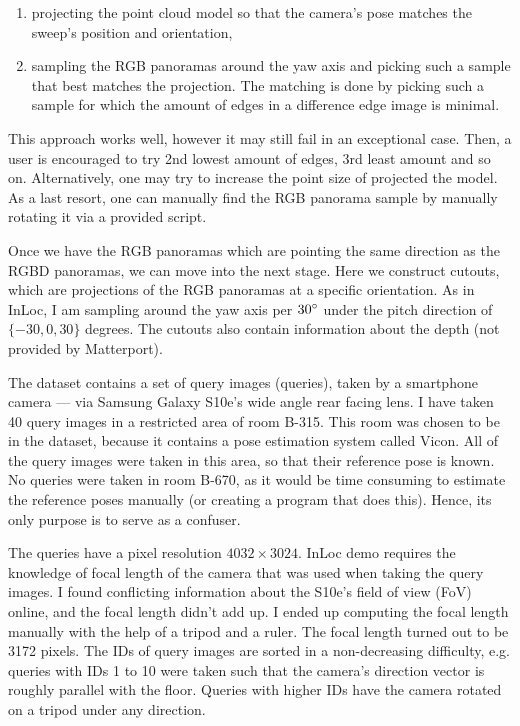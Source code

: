 \documentclass[twoside]{ctuthesis}
\theoremstyle{plain}
\theoremstyle{definition}
\theoremstyle{note}
\begin{document}
\begin{enumerate}
	\item projecting the point cloud model so that the camera's pose matches the sweep's position and orientation,
	\item sampling the RGB panoramas around the yaw axis and picking such a sample that best matches the projection. The matching is done by picking such a sample for which the amount of edges in a difference edge image is minimal.
\end{enumerate}

This approach works well, however it may still fail in an exceptional case. Then, a user is encouraged to try 2nd lowest amount of edges, 3rd least amount and so on. Alternatively, one may try to increase the point size of projected the model. As a last resort, one can manually find the RGB panorama sample by manually rotating it via a provided script.

Once we have the RGB panoramas which are pointing the same direction as the RGBD panoramas, we can move into the next stage. Here we construct cutouts, which are projections of the RGB panoramas at a specific orientation. As in InLoc, I am sampling around the yaw axis per $30\degree$ under the pitch direction of $\{-30, 0, 30\}$ degrees. The cutouts also contain information about the depth (not provided by Matterport).

The dataset contains a set of query images (queries), taken by a smartphone camera --- via Samsung Galaxy S10e's wide angle rear facing lens. I have taken 40 query images in a restricted area of room B-315. This room was chosen to be in the dataset, because it contains a pose estimation system called Vicon. All of the query images were taken in this area, so that their reference pose is known. No queries were taken in room B-670, as it would be time consuming to estimate the reference poses manually (or creating a program that does this). Hence, its only purpose is to serve as a confuser.

The queries have a pixel resolution $4032 \times 3024$. InLoc demo requires the knowledge of focal length of the camera that was used when taking the query images. I found conflicting information about the S10e's field of view (FoV) online, and the focal length didn't add up. I ended up computing the focal length manually with the help of a tripod and a ruler. The focal length turned out to be 3172 pixels. The IDs of query images are sorted in a non-decreasing difficulty, e.g. queries with IDs 1 to 10 were taken such that the camera's direction vector is roughly parallel with the floor. Queries with higher IDs have the camera rotated on a tripod under any direction.
\end{document}
